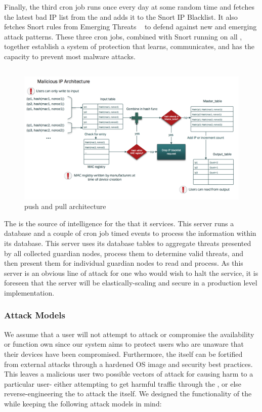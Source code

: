 Finally, the third cron job runs once every day at some random time and fetches the latest bad IP list from the \servname and adds it to the Snort IP Blacklist. It also fetches Snort rules from Emerging Threats ~\cite{emerging} to defend against new and emerging attack patterns. These three cron jobs, combined with Snort running on all \nodenames, together establish a system of protection that learns, communicates, and has the capacity to prevent most malware attacks.

\subsection{\servname}
\label{sec:design:server}

\begin{figure}
    \centering
    \includegraphics[width=0.95\linewidth]{figs/blacklistserver.png}
    \caption{\servname push and pull architecture}
    \label{fig:blacklistserver}
\end{figure}

The \servname is the source of intelligence for the \nodenames that it services. This server runs a database and a couple of cron job timed events to process the information within its database. This server uses its database tables to aggregate threats presented by all collected guardian nodes, process them to determine valid threats, and then present them for individual guardian nodes to read and process. As this server is an obvious line of attack for one who would wish to halt the \sysname service, it is foreseen that the server will be elastically-scaling and secure in a production level implementation. 

\subsubsection{Attack Models}
\label{sec:design:attacks}
We assume that a user will not attempt to attack or compromise the availability or function own \nodename since our system aims to protect users who are unaware that their devices have been compromised. Furthermore, the \nodename itself can be fortified from external attacks through a hardened OS image and security best practices. This leaves a malicious user two possible vectors of attack for causing harm to a particular user- either attempting to get harmful traffic through the \nodename, or else reverse-engineering the \nodename to attack the \servname itself. 
We designed the functionality of the \servname while keeping the following attack models in mind:

